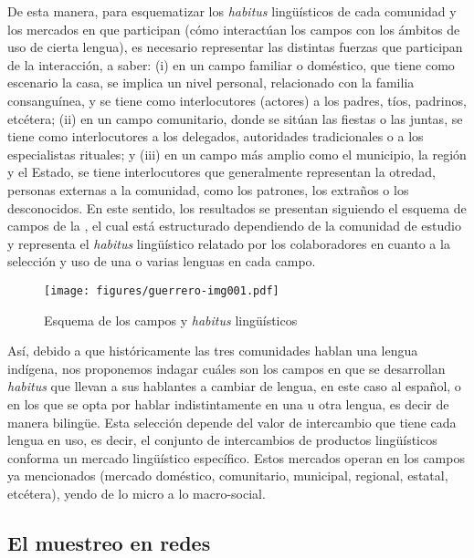 \documentclass[output=paper]{../langscibook}
\begin{document}
De esta manera, para esquematizar los \textit{habitus} lingüísticos de cada comunidad y los mercados en que participan (cómo interactúan los campos con los ámbitos de uso de cierta lengua), es necesario representar las distintas fuerzas que participan de la interacción, a saber: (i) en un campo familiar o doméstico, que tiene como escenario la casa, se implica un nivel personal, relacionado con la familia consanguínea, y se tiene como interlocutores (actores) a los padres, tíos, padrinos, etcétera; (ii) en un campo comunitario, donde se sitúan las fiestas o las juntas, se tiene como interlocutores a los delegados, autoridades tradicionales o a los especialistas rituales; y (iii) en un campo más amplio como el municipio, la región y el Estado, se tiene interlocutores que generalmente representan la otredad, personas externas a la comunidad, como los patrones, los extraños o los desconocidos. En este sentido, los resultados se presentan siguiendo el esquema de campos de la , el cual está estructurado dependiendo de la comunidad de estudio y representa el \textit{habitus} lingüístico relatado por los colaboradores en cuanto a la selección y uso de una o varias lenguas en cada campo.




\begin{figure}
\caption{\label{fig:guerrero:1} Esquema de los campos y \emph{habitus} lingüísticos \citep[309]{GuerreroGalván2016}}
\texttt{[image: figures/guerrero-img001.pdf]}
\end{figure}

Así, debido a que históricamente las tres comunidades hablan una lengua indígena, nos proponemos indagar cuáles son los campos en que se desarrollan \textit{habitus} que llevan a sus hablantes a cambiar de lengua, en este caso al español, o en los que se opta por hablar indistintamente en una u otra lengua, es decir de manera bilingüe. Esta selección depende del valor de intercambio que tiene cada lengua en uso, es decir, el conjunto de intercambios de productos lingüísticos conforma un mercado lingüístico específico. Estos mercados operan en los campos ya mencionados (mercado doméstico, comunitario, municipal, regional, estatal, etcétera), yendo de lo micro a lo macro-social.



 \subsection{El muestreo en redes}
\end{document}
